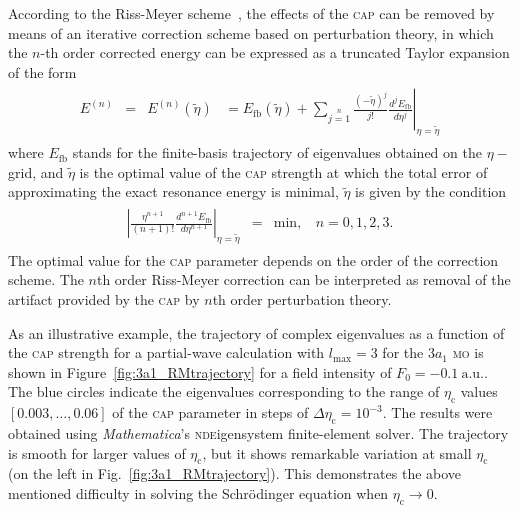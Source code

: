 According to the Riss-Meyer scheme~\cite{RissMeyer_1993}, the effects
of the \textsc{cap} can be removed by means of an iterative correction
scheme based on perturbation theory, in which the $n$-th order
corrected energy can be expressed as a truncated Taylor expansion of
the form
%
\begin{eqnarray}
  \begin{split}
    E^{(n)} & = & E^{(n)}(\tilde{\eta}) & =
    E_{\mathrm{fb}}(\tilde{\eta}) +
    \sum\limits_{j=1}\limits^{n}
    \left.
    \frac{(-\tilde{\eta})^{j}}{j!} \frac{d^{j}E_{\mathrm{fb}}}{d\eta^{j}}
    \right|_{\eta=\tilde{\eta}}
  \end{split}
  \label{eq:RM_scheme}
\end{eqnarray}
%
where $E_{\mathrm{fb}}$ stands for the finite-basis trajectory of
eigenvalues obtained on the $\eta-$grid, and $\tilde{\eta}$ is the
optimal value of the \textsc{cap} strength at which the total error of
approximating the exact resonance energy is minimal, $\tilde{\eta}$ is
given by the condition
%
\begin{eqnarray}
  \begin{split}
    \left| \frac{\eta^{n+1}}{(n + 1)!} \frac{d^{n+1} E_{\mathrm{fb}}}{d\eta^{n+1}}
    \right|_{\eta=\tilde{\eta}} & = & \mathrm{min}, ~~~~ n = 0,1,2,3.
  \end{split}
  \label{eq:optimal_eta}
\end{eqnarray}
%
The optimal value for the \textsc{cap} parameter depends on the order
of the correction scheme. The $n$th order Riss-Meyer correction can be
interpreted as removal of the artifact provided by the \textsc{cap} by
$n$th order perturbation theory.

As an illustrative example, the trajectory of complex eigenvalues as a
function of the \textsc{cap} strength for a partial-wave calculation
with $l_{\mathrm{max}}=3$ for the $3a_{1}$ \textsc{mo} is shown in
Figure~\ref{fig:3a1_RMtrajectory} for a field intensity of $F_{0} =
-0.1\ \mathrm{a.u.}$. The blue circles indicate the eigenvalues
corresponding to the range of $\eta_{\mathrm{c}}$ values $[0.003,
  \dots, 0.06]$ of the \textsc{cap} parameter in steps of
$\Delta\eta_{\mathrm{c}} = 10^{-3}$. The results were obtained using
\emph{Mathematica}'s \textsc{nde}igensystem finite-element solver. The
trajectory is smooth for larger values of $\eta_{\mathrm{c}}$, but it
shows remarkable variation at small $\eta_{\mathrm{c}}$ (on the left
in Fig.~\ref{fig:3a1_RMtrajectory}). This demonstrates the above
mentioned difficulty in solving the Schr\"{o}dinger equation when
$\eta_{\mathrm{c}}\to 0$.

